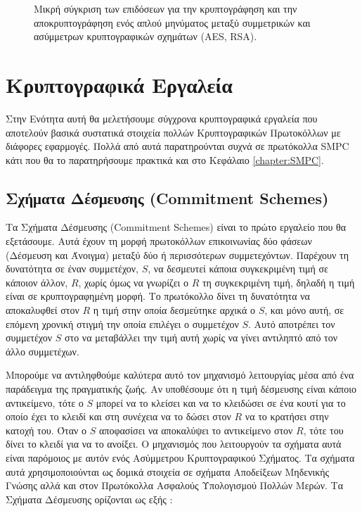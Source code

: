 \begin{figure}[h]
    \begin{center}
        \inputminted[fontsize=\scriptsize,frame=single]{python}{./01_body/code/rsa-vs-aes.py}
        \inputminted[fontsize=\scriptsize,frame=single]{text}{./01_body/code/rsa-vs-aes.output}
    \end{center}
    \caption{Μικρή σύγκριση των επιδόσεων για την κρυπτογράφηση και την αποκρυπτογράφηση ενός απλού μηνύματος μεταξύ συμμετρικών και ασύμμετρων κρυπτογραφικών σχημάτων (AES, RSA).}
    \label{code:rsa_vs_aes}
\end{figure}

\section{Κρυπτογραφικά Εργαλεία}

Στην Ενότητα αυτή θα μελετήσουμε σύγχρονα κρυπτογραφικά εργαλεία που αποτελούν βασικά συστατικά στοιχεία πολλών Κρυπτογραφικών Πρωτοκόλλων με διάφορες εφαρμογές. Πολλά από αυτά παρατηρούνται συχνά σε πρωτόκολλα SMPC κάτι που θα το παρατηρήσουμε πρακτικά και στο Κεφάλαιο \ref{chapter:SMPC}.

\subsection{Σχήματα Δέσμευσης (Commitment Schemes)}

Τα Σχήματα Δέσμευσης (Commitment Schemes) είναι το πρώτο εργαλείο που θα εξετάσουμε. Αυτά έχουν τη μορφή πρωτοκόλλων επικοινωνίας δύο φάσεων (Δέσμευση και Άνοιγμα) μεταξύ δύο ή περισσότερων συμμετεχόντων. Παρέχουν τη δυνατότητα σε έναν συμμετέχον, $S$, να δεσμευτεί κάποια συγκεκριμένη τιμή σε κάποιον άλλον, $R$, χωρίς όμως να γνωρίζει ο $R$ τη συγκεκριμένη τιμή, δηλαδή η τιμή είναι σε κρυπτογραφημένη μορφή. Το πρωτόκολλο δίνει τη δυνατότητα να αποκαλυφθεί στον $R$ η τιμή στην οποία δεσμεύτηκε αρχικά ο $S$, και μόνο αυτή, σε επόμενη χρονική στιγμή την οποία επιλέγει ο συμμετέχον $S$. Αυτό αποτρέπει τον συμμετέχον $S$ στο να μεταβάλλει την τιμή αυτή χωρίς να γίνει αντιληπτό από τον άλλο συμμετέχων.

Μπορούμε να αντιληφθούμε καλύτερα αυτό τον μηχανισμό λειτουργίας μέσα από ένα παράδειγμα της πραγματικής ζωής. Αν υποθέσουμε ότι η τιμή δέσμευσης είναι κάποιο αντικείμενο, τότε ο $S$ μπορεί να το κλείσει και να το κλειδώσει σε ένα κουτί για το οποίο έχει το κλειδί και στη συνέχεια να το δώσει στον $R$ να το κρατήσει στην κατοχή του. Όταν ο $S$ αποφασίσει να αποκαλύψει το αντικείμενο στον $R$, τότε του δίνει το κλειδί για να το ανοίξει. Ο μηχανισμός που λειτουργούν τα σχήματα αυτά είναι παρόμοιος με αυτόν ενός Ασύμμετρου Κρυπτογραφικού Σχήματος. Τα σχήματα αυτά χρησιμοποιούνται ως δομικά στοιχεία σε σχήματα Αποδείξεων Μηδενικής Γνώσης αλλά και στον Πρωτόκολλα Ασφαλούς Υπολογισμού Πολλών Μερών. Τα Σχήματα Δέσμευσης ορίζονται ως εξής :

